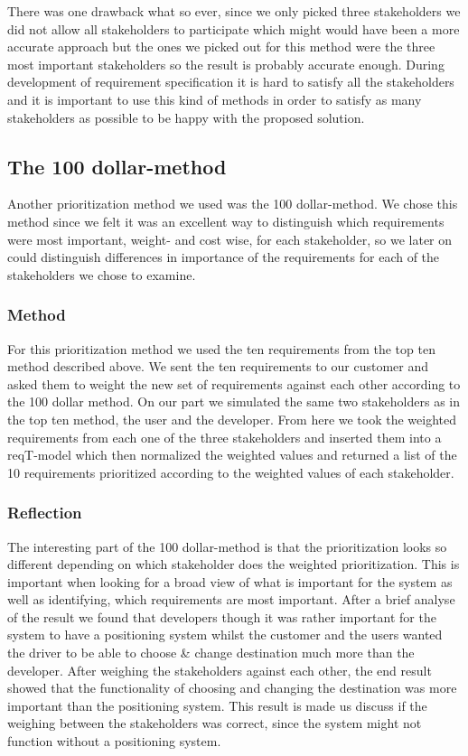 \documentclass[10pt]{article}
\begin{document}
\noindent There was one drawback what so ever, since we only picked three stakeholders we did not allow all stakeholders to participate which might would have been a more accurate approach but the ones we picked out for this method were the three most important stakeholders so the result is probably accurate enough.
During development of requirement specification it is hard to satisfy all the stakeholders and it is important to use this kind of methods in order to satisfy as many stakeholders as possible to be happy with the proposed solution.

\subsection{The 100 dollar-method}
Another prioritization method we used was the 100 dollar-method. We chose this method since we felt it was an excellent way to distinguish which requirements were most important, weight- and cost wise, for each stakeholder, so we later on could distinguish differences in importance of the requirements for each of the stakeholders we chose to examine.
\subsubsection{Method}
For this prioritization method we used the ten requirements from the top ten method described above. We sent the ten requirements to our customer and asked them to weight the new set of requirements against each other according to the 100 dollar method. On our part we simulated the same two stakeholders as in the top ten method, the user and the developer. From here we took the weighted requirements from each one of the three stakeholders and inserted them into a reqT-model which then normalized the weighted values and returned a list of the 10 requirements prioritized according to the weighted values of each stakeholder.
\subsubsection{Reflection}
The interesting part of the 100 dollar-method is that the prioritization looks so different depending on which stakeholder does the weighted prioritization. This is important when looking for a broad view of what is important for the system as well as identifying, which requirements are most important. After a brief analyse of the result we found that developers though it was rather important for the system to have a positioning system whilst the customer and the users wanted the driver to be able to choose \& change destination much more than the developer. After weighing the stakeholders against each other, the end result showed that the functionality of choosing and changing the destination was more important than the positioning system. This result is made us discuss if the weighing between the stakeholders was correct, since the system might not function without a positioning system.
\end{document}
